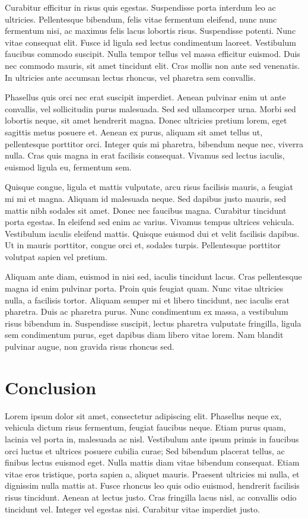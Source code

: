 \documentclass[
  oneside,
  open=any]{scrbook}
\begin{document}
Curabitur efficitur in risus quis egestas. Suspendisse porta interdum
leo ac ultricies. Pellentesque bibendum, felis vitae fermentum eleifend,
nunc nunc fermentum nisi, ac maximus felis lacus lobortis risus.
Suspendisse potenti. Nunc vitae consequat elit. Fusce id ligula sed
lectus condimentum laoreet. Vestibulum faucibus commodo suscipit. Nulla
tempor tellus vel massa efficitur euismod. Duis nec commodo mauris, sit
amet tincidunt elit. Cras mollis non ante sed venenatis. In ultricies
ante accumsan lectus rhoncus, vel pharetra sem convallis.

Phasellus quis orci nec erat suscipit imperdiet. Aenean pulvinar enim ut
ante convallis, vel sollicitudin purus malesuada. Sed sed ullamcorper
urna. Morbi sed lobortis neque, sit amet hendrerit magna. Donec
ultricies pretium lorem, eget sagittis metus posuere et. Aenean ex
purus, aliquam sit amet tellus ut, pellentesque porttitor orci. Integer
quis mi pharetra, bibendum neque nec, viverra nulla. Cras quis magna in
erat facilisis consequat. Vivamus sed lectus iaculis, euismod ligula eu,
fermentum sem.

Quisque congue, ligula et mattis vulputate, arcu risus facilisis mauris,
a feugiat mi mi et magna. Aliquam id malesuada neque. Sed dapibus justo
mauris, sed mattis nibh sodales sit amet. Donec nec faucibus magna.
Curabitur tincidunt porta egestas. In eleifend sed enim ac varius.
Vivamus tempus ultrices vehicula. Vestibulum iaculis eleifend mattis.
Quisque euismod dui et velit facilisis dapibus. Ut in mauris porttitor,
congue orci et, sodales turpis. Pellentesque porttitor volutpat sapien
vel pretium.

Aliquam ante diam, euismod in nisi sed, iaculis tincidunt lacus. Cras
pellentesque magna id enim pulvinar porta. Proin quis feugiat quam. Nunc
vitae ultricies nulla, a facilisis tortor. Aliquam semper mi et libero
tincidunt, nec iaculis erat pharetra. Duis ac pharetra purus. Nunc
condimentum ex massa, a vestibulum risus bibendum in. Suspendisse
suscipit, lectus pharetra vulputate fringilla, ligula sem condimentum
purus, eget dapibus diam libero vitae lorem. Nam blandit pulvinar augue,
non gravida risus rhoncus sed.

\hypertarget{conclusion}{%
\chapter{Conclusion}\label{conclusion}}

Lorem ipsum dolor sit amet, consectetur adipiscing elit. Phasellus neque
ex, vehicula dictum risus fermentum, feugiat faucibus neque. Etiam purus
quam, lacinia vel porta in, malesuada ac nisl. Vestibulum ante ipsum
primis in faucibus orci luctus et ultrices posuere cubilia curae; Sed
bibendum placerat tellus, ac finibus lectus euismod eget. Nulla mattis
diam vitae bibendum consequat. Etiam vitae eros tristique, porta sapien
a, aliquet mauris. Praesent ultricies mi nulla, et dignissim nulla
mattis at. Fusce rhoncus leo quis odio euismod, hendrerit facilisis
risus tincidunt. Aenean at lectus justo. Cras fringilla lacus nisl, ac
convallis odio tincidunt vel. Integer vel egestas nisi. Curabitur vitae
imperdiet justo.
\end{document}
